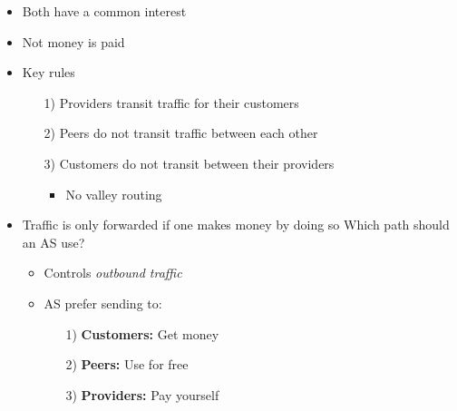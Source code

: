 \begin{itemize}
\begin{itemize}
\begin{itemize}
\begin{itemize}
                                \begin{itemize}
                                    \item Both have a common interest
                                    \item Not money is paid
                                \end{itemize}
                        \end{itemize}
                        \begin{itemize}
                            \item Key rules
                                \begin{itemize}
                                    \item[1)] Providers transit traffic for their customers
                                    \item[2)] Peers do not transit traffic between each other
                                    \item[3)] Customers do not transit between their providers
                                        \begin{itemize}
                                            \item No valley routing
                                        \end{itemize}
                                \end{itemize}
                            \item Traffic is only forwarded if one makes money by doing so
                             Which path should an AS use?
                                \begin{itemize}
                                    \item Controls \textit{outbound traffic}
                                    \item AS prefer sending to:
                                        \begin{itemize}
                                            \item[1)] \textbf{Customers:} Get money
                                            \item[2)] \textbf{Peers:} Use for free
                                            \item[3)] \textbf{Providers:} Pay yourself
                                        \end{itemize}

\end{itemize}
\end{itemize}
\end{itemize}
\end{itemize}
\end{itemize}
